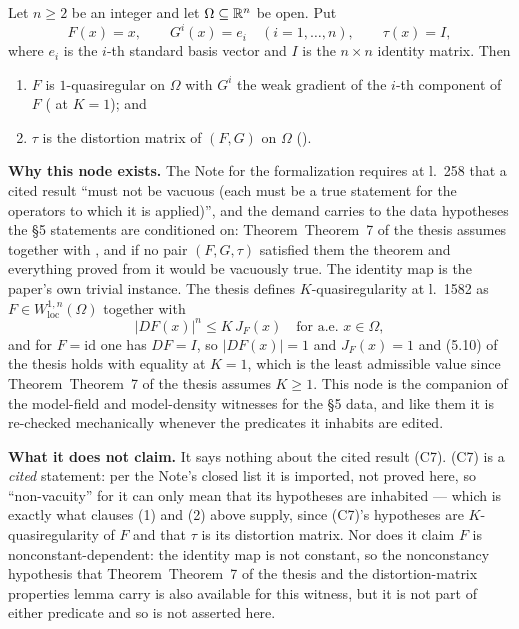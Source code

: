 \begin{lemma}[The identity map inhabits the quasiregularity data of \S5 at $K=1$]
Let $n\ge2$ be an integer and let $\Omega\subseteq\mathbb{R}^n$ be open.  Put
\[
F(x)=x,\qquad G^i(x)=e_i\quad(i=1,\dots,n),\qquad \tau(x)=I,
\]
where $e_i$ is the $i$-th standard basis vector and $I$ is the $n\times n$
identity matrix.  Then
\begin{enumerate}
\item $F$ is $1$-quasiregular on $\Omega$ with $G^i$ the weak gradient of the
  $i$-th component of $F$ ( at $K=1$); and
\item $\tau$ is the distortion matrix of $(F,G)$ on $\Omega$
  ().
\end{enumerate}

\noindent\textbf{Why this node exists.}  The Note for the formalization requires
at l.~258 that a cited result ``must not be vacuous (each must be a true
statement for the operators to which it is applied)'', and the demand carries to
the data hypotheses the \S5 statements are conditioned on: Theorem~Theorem~7 of the thesis
assumes  together with ,
and if no pair $(F,G,\tau)$ satisfied them the theorem and everything proved from
it would be vacuously true.  The identity map is the paper's own trivial
instance.  The thesis defines $K$-quasiregularity at l.~1582 as
$F\in W^{1,n}_{\mathrm{loc}}(\Omega)$ together with
\[
|DF(x)|^n\le K\,J_F(x)\quad\text{for a.e. }x\in\Omega,
\tag{5.10}
\]
and for $F=\mathrm{id}$ one has $DF=I$, so $|DF(x)|=1$ and $J_F(x)=1$ and
(5.10) of the thesis holds with equality at $K=1$, which is the least admissible
value since Theorem~Theorem~7 of the thesis assumes $K\ge1$.  This node is the companion of the
model-field and model-density witnesses for the
\S5 data, and like them it is re-checked mechanically whenever the predicates it
inhabits are edited.

\textbf{What it does not claim.}  It says nothing about the cited result (C7).
(C7) is a \emph{cited} statement: per the Note's closed list it is imported, not
proved here, so ``non-vacuity'' for it can only mean that its hypotheses are
inhabited --- which is exactly what clauses (1) and (2) above supply, since
(C7)'s hypotheses are $K$-quasiregularity of $F$ and that $\tau$ is its
distortion matrix.  Nor does it claim $F$ is nonconstant-dependent: the identity
map is not constant, so the nonconstancy hypothesis that
Theorem~Theorem~7 of the thesis and the distortion-matrix properties lemma carry is also
available for this witness, but it is not part of either predicate and so is not
asserted here.
\end{lemma}
